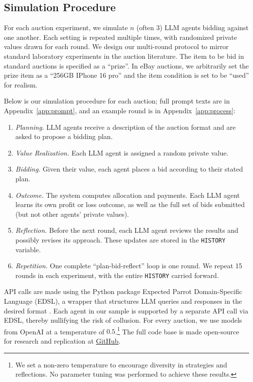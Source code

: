 \documentclass{article} %
\newcommand{\kibitz}[2]{\ifnum\Comments=1{\color{#1}{#2}}\fi}
\newcommand{\avs}[1]{\kibitz{purple}{[avs: #1]}}
\begin{document}


\subsection{Simulation Procedure}\label{sec:process}

For each auction experiment, we simulate $n$ (often 3) LLM agents bidding against one another. Each setting is repeated multiple times, with randomized private values drawn for each round. We design our multi-round protocol to mirror standard laboratory experiments in the auction literature. The item to be bid in standard auctions is specified as a ``prize''. In eBay auctions, we arbitrarily set the prize item as a ``256GB IPhone 16 pro'' and the item condition is set to be ``used'' for realism.

Below is our simulation procedure for each auction; full prompt texts are in Appendix~\ref{app:prompt}, and an example round is in Appendix~\ref{app:process}:
\begin{enumerate}
    \item {\textit{Planning.} LLM agents receive a description of the auction format and are asked to propose a bidding plan.}
    \item {\textit{Value Realization.} Each LLM agent is assigned a random private value.}
    \item {\textit{Bidding.} Given their value, each agent places a bid according to their stated plan.}
    \item {\textit{Outcome.} The system computes allocation and payments. Each LLM agent learns its own profit or loss outcome, as well as the full set of bids submitted (but not other agents' private values).}
    \item {\textit{Reflection.} Before the next round, each LLM agent reviews the results and possibly revises its approach. These updates are stored in the \texttt{HISTORY} variable.}
    \item {\textit{Repetition.} One complete “plan-bid-reflect” loop is one round. We repeat 15 rounds in each experiment, with the entire \texttt{HISTORY} carried forward.}
\end{enumerate}

API calls are made using the Python package Expected Parrot Domain-Specific Language (EDSL), a wrapper that structures LLM queries and responses in the desired format \citep{Horton2024EDSL}. Each agent in our sample is supported by a separate API call via EDSL, thereby nullifying the risk of collusion. For every auction, we use models from OpenAI at a temperature of $0.5$.\footnote{{We set a non-zero temperature to encourage diversity in strategies and reflections. No parameter tuning was performed to achieve these results.}} 
The full code base is made open-source for research and replication at \href{https://github.com/KeHang-Zhu/llm-auction}{GitHub}.
\end{document}
